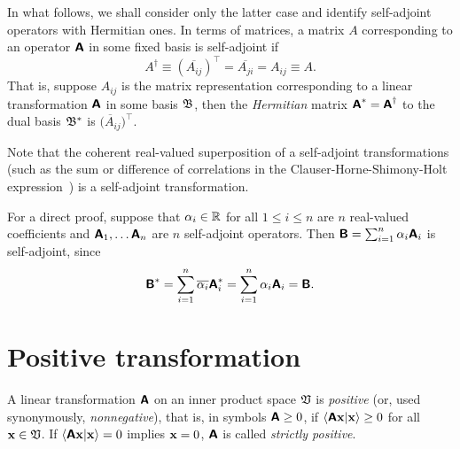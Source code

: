In what follows, we shall consider only the latter case and identify self-adjoint operators with Hermitian ones.
In terms of matrices, a matrix $A$ corresponding to an operator $\textsf{\textbf{A}}$ in
some fixed basis is self-adjoint
if
\begin{equation}
A^{\dagger}\equiv (\overline{A_{ij}})^\intercal =  \overline{A_{ji}} =A_{ij} \equiv A.
\end{equation}
That is, suppose $A_{ij}$ is the matrix representation
corresponding to a linear transformation $\textsf{\textbf{A}}$  in some basis ${\frak B}$,
then the {\em Hermitian} matrix $\textsf{\textbf{A}}^\ast = \textsf{\textbf{A}}^\dagger$
to the dual basis
${\frak B}^\ast $
is
$\overline{(A_{ij}})^\intercal $.





Note that the coherent real-valued superposition
of a self-adjoint transformations
(such as the sum or difference of correlations in
the Clauser-Horne-Shimony-Holt expression~\cite{filipp-svo-04-qpoly-prl})
is a self-adjoint transformation.

{%
For a direct proof,
suppose that $\alpha_i \in {\Bbb R}$ for all $1\le i \le n$ are $n$ real-valued coefficients and
$\textsf{\textbf{A}}_1, \ldots \textsf{\textbf{A}}_n$ are $n$ self-adjoint operators.
Then
$\textsf{\textbf{B}} = \sum_{i=1}^n \alpha_i \textsf{\textbf{A}}_i$
is self-adjoint, since
\begin{equation}
\textsf{\textbf{B}}^\ast  = \sum_{i=1}^n \overline{\alpha_i} \textsf{\textbf{A}}_i^\ast  = \sum_{i=1}^n  \alpha_i  \textsf{\textbf{A}}_i
=\textsf{\textbf{B}}
.
\end{equation}
}

\section{Positive transformation}
\label{2015-m-ch-fdlvs-positive}

A linear transformation  $\textsf{\textbf{A}}$ on an inner product space ${\frak V}$ is {\em positive} (or, used synonymously, {\em nonnegative}),
that is, in symbols $\textsf{\textbf{A}}\ge 0$,
if $\langle \textsf{\textbf{A}}{\bf x}\vert {\bf x}\rangle  \ge 0$ for all ${\bf x}\in {\frak V}$.
If  $\langle \textsf{\textbf{A}}{\bf x}\vert {\bf x}\rangle = 0$ implies
${\bf x}=0$, $\textsf{\textbf{A}}$ is called {\em strictly positive}.


